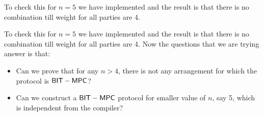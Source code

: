 To check this for $n=5$ we have implemented and the result is that there is no combination till weight for all parties are 4.

To check this for $n=5$ we have implemented and the result is that there is no combination till weight for all parties are 4. 
Now the questions that we are trying answer is that:
\begin{itemize}
	\item Can we prove that for any $n>4$, there is not any arrangement for which the protocol is $\mathsf{BIT-MPC}$?
	\item Can we construct a $\mathsf{BIT-MPC}$ protocol for smaller value of $n$, say 5, which is independent from the compiler?
\end{itemize}

